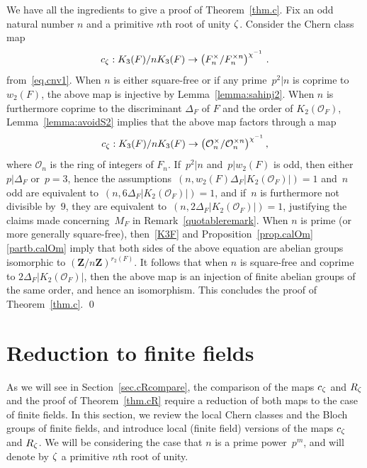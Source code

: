 \documentclass[12pt,reqno]{amsart}
\theoremstyle{definition}
\newcommand{\changed}[1]{{#1}}
\newcommand{\frankchanged}[1]{{#1}}
\def\Z{\mathbf Z}   %
\def\calO{\mathcal O}
\def\nn{n}
\def\ll{m}
\def\OL{\mathcal{O}}
\begin{document}
We have all the ingredients to give a proof of Theorem~\ref{thm.c}.
Fix an odd natural number $\nn$ and a primitive $\nn$th root of unity $\zeta$.
Consider the Chern class map
$$
c_\z: K_3(F)/\nn K_3(F) \to %
\left(F_\nn^{\times}/F_\nn^{\times \nn}\right)^{\chi^{-1}} \,.
$$
from~\eqref{eq.cnv1}. When $\nn$ is \changed{either square-free or
if any prime~$p^2 | n$ is}
coprime to $w_2(F)$, the above map
is injective by Lemma~\ref{lemma:sahinj2}. When $\nn$ is 
\changed{furthermore} coprime to the
discriminant $\Delta_F$ of $F$ and the order of $K_2(\calO_F)$, 
Lemma~\ref{lemma:avoidS2}
implies that the above map factors through a map
$$
c_\z: K_3(F)/\nn K_3(F) \to %
\left(\calO_\nn^{\times}/\calO_\nn^{\times \nn}\right)^{\chi^{-1}},
$$
where $\calO_\nn$ is the ring of integers of $F_\nn$. 
\frankchanged{If~$p^2 | \nn$ and~$p | w_2(F)$ is odd, then either~$p | \Delta_F$ or~$p = 3$,
hence the assumptions~$(n, w_2(F) \Delta_F |K_2(\OL_F)|) = 1$ and~$n$ odd are equivalent 
to~$(n,6 \Delta_F |K_2(\OL_F)|) = 1$, and if~$n$ is furthermore
not divisible by~$9$, they are equivalent to~$(n, 2 \Delta_F |K_2(\OL_F)|) = 1$,
justifying the claims made concerning~$M_F$ in Remark~\ref{quotableremark}.}
When $\nn$ is 
\changed{prime (or more generally square-free)}, 
 then~\eqref{K3F} and 
Proposition~\ref{prop.calOm}\ref{partb.calOm} imply that both sides of the above equation
are abelian groups isomorphic to $(\Z/\nn\Z)^{r_2(F)}$. It follows that
when $n$ is square-free and coprime to \changed{$2 \Delta_F |K_2(\calO_F)|$},
then the above map is an injection of finite abelian groups of the same
order, and hence an isomorphism. This concludes the proof of 
Theorem~\ref{thm.c}.
\qed


\section{Reduction to finite fields}
\label{sec.ff}

As we will see in Section~\ref{sec.cRcompare},
the comparison of the maps $c_{\zeta}$ and $R_{\zeta}$ and the proof
of Theorem~\ref{thm.cR} require a reduction of both maps to the case of
finite fields. In this section, we review the local Chern classes and the 
Bloch groups of finite fields, and introduce local (finite field) versions
of the maps $c_\zeta$ and $R_\zeta$. We will be considering the case that 
$\nn$ is a prime power~$p^\ll$, and will denote by $\zeta$ a primitive 
$\nn$th root of unity. 
\end{document}
